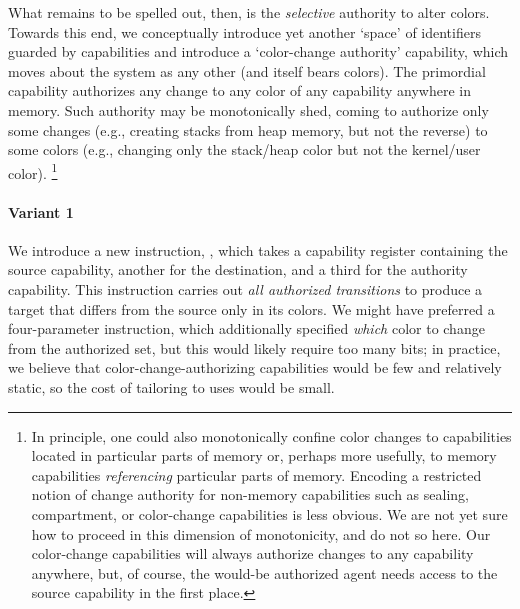 What remains to be spelled out, then, is the \emph{selective} authority to
alter colors.  Towards this end, we conceptually introduce yet another
`space' of identifiers guarded by capabilities and introduce a
`color-change authority' capability, which moves about the system as any
other (and itself bears colors).  The primordial capability authorizes
any change to any color of any capability anywhere in memory.  Such
authority may be monotonically shed, coming to authorize only some changes
(e.g., creating stacks from heap memory, but not the reverse) to some colors
(e.g., changing only the stack/heap color but not the kernel/user color).%
%
\footnote{In principle, one could also monotonically confine color changes
to capabilities located in particular parts of memory or, perhaps more
usefully, to memory capabilities \emph{referencing} particular parts of
memory.  Encoding a restricted notion of change authority for non-memory
capabilities such as sealing, compartment, or color-change capabilities is
less obvious.  We are not yet sure how to proceed in this dimension of
monotonicity, and do not so here.  Our color-change capabilities will
always authorize changes to any capability anywhere, but, of course, the
would-be authorized agent needs access to the source capability in the first
place.}

\paragraph{Variant 1}
%
We introduce a new instruction, , which takes a
capability register containing the source capability, another for the
destination, and a third for the authority capability.  This instruction
carries out \emph{all authorized transitions} to produce a target that differs from the source only
in its colors.  We might have preferred a four-parameter instruction, which
additionally specified \emph{which} color to change from the authorized set,
but this would likely require too many bits; in practice, we believe that
color-change-authorizing capabilities would be few and relatively static, so
the cost of tailoring to uses would be small.

